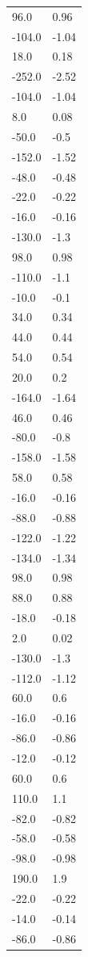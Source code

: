 \begin{longtable}{ll}
96.0 & 0.96 \\
-104.0 & -1.04 \\
18.0 & 0.18 \\
-252.0 & -2.52 \\
-104.0 & -1.04 \\
8.0 & 0.08 \\
-50.0 & -0.5 \\
-152.0 & -1.52 \\
-48.0 & -0.48 \\
-22.0 & -0.22 \\
-16.0 & -0.16 \\
-130.0 & -1.3 \\
98.0 & 0.98 \\
-110.0 & -1.1 \\
-10.0 & -0.1 \\
34.0 & 0.34 \\
44.0 & 0.44 \\
54.0 & 0.54 \\
20.0 & 0.2 \\
-164.0 & -1.64 \\
46.0 & 0.46 \\
-80.0 & -0.8 \\
-158.0 & -1.58 \\
58.0 & 0.58 \\
-16.0 & -0.16 \\
-88.0 & -0.88 \\
-122.0 & -1.22 \\
-134.0 & -1.34 \\
98.0 & 0.98 \\
88.0 & 0.88 \\
-18.0 & -0.18 \\
2.0 & 0.02 \\
-130.0 & -1.3 \\
-112.0 & -1.12 \\
60.0 & 0.6 \\
-16.0 & -0.16 \\
-86.0 & -0.86 \\
-12.0 & -0.12 \\
60.0 & 0.6 \\
110.0 & 1.1 \\
-82.0 & -0.82 \\
-58.0 & -0.58 \\
-98.0 & -0.98 \\
190.0 & 1.9 \\
-22.0 & -0.22 \\
-14.0 & -0.14 \\
-86.0 & -0.86 \\

\end{longtable}
